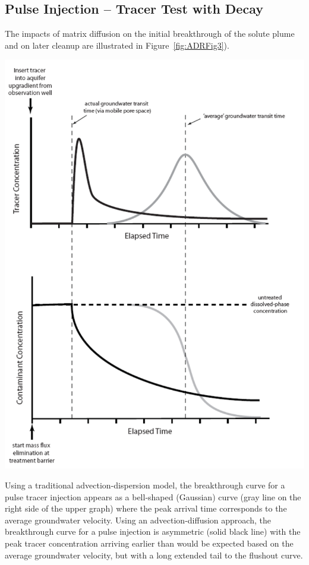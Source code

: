 \documentclass{tufte-handout}\usepackage[]{graphicx}\usepackage[]{xcolor}
\begin{document}
\subsection{Pulse Injection -- Tracer Test with Decay}


The impacts of matrix diffusion on the initial breakthrough of the solute plume and on later cleanup are illustrated in Figure~\ref{fig:ADRFig3}). 

\begin{marginfigure}
\includegraphics[width=1.0\textwidth]{graphics/ADRFig3.png}
\caption{Using a traditional advection-dispersion model, the breakthrough curve for a pulse tracer injection appears as a bell-shaped (Gaussian) curve (gray line on the right side of the upper graph) where the peak arrival time corresponds to the average groundwater velocity. Using an advection-diffusion approach, the breakthrough curve for a pulse injection is asymmetric (solid black line) with the peak tracer concentration arriving earlier than would be expected based on the average groundwater velocity, but with a long extended tail to the flushout curve.}
\label{fig:ADRFig3}
\end{marginfigure}
\end{document}
